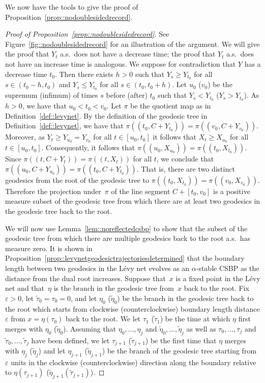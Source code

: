 \documentclass[JEP,XML,SOM,Unicode]{cedram}
\let\epsilon\varepsilon
\theoremstyle{plain}
\numberwithin{theorem}{section}
\theoremstyle{definition}
\let\wt\widetilde
\begin{document}
We now have the tools to give the proof of Proposition~\ref{prop::nodoublesidedrecord}.

\begin{proof}[Proof of Proposition~\ref{prop::nodoublesidedrecord}]
See Figure~\ref{fig::nodoublesidedrecord} for an illustration of the argument. We will give the proof that $Y_t$ a.s.\ does not have a decrease time; the proof that $Y_t$ a.s.\ does not have an increase time is analogous. We suppose for contradiction that $Y$ has a decrease time $t_0$. Then there exists $h > 0$ such that $Y_s \geq Y_{t_0}$ for all $s \in (t_0-h,t_0)$ and $Y_s \leq Y_{t_0}$ for all $s \in (t_0,t_0+h)$. Let $u_0$ (\resp $v_0$) be the supremum (\resp infimum) of times $s$ before (\resp after) $t_0$ such that $Y_s < Y_{t_0}$ (\resp $Y_s > Y_{t_0}$). As $h > 0$, we have that $u_0 < t_0 < v_0$. Let $\pi$ be the quotient map as in Definition~\ref{def::levynet}. By the definition of the geodesic tree in Definition~\ref{def::levynet}, we have that $\pi( (t_0,C+Y_{t_0})) = \pi((v_0,C+Y_{v_0}))$. Moreover, as $Y_t \geq Y_{u_0} = Y_{v_0}$ for all $t \in [u_0,t_0]$ it follows that $X_t \geq X_{u_0}$ for all $t \in [u_0,t_0]$. Consequently, it follows that $\pi((u_0,X_{u_0})) = \pi((t_0,X_{t_0}))$. Since $\pi((t,C+Y_t)) = \pi((t,X_t))$ for all $t$, we conclude that $\pi((u_0,C+Y_{u_0})) = \pi((t_0,C+Y_{t_0}))$. That is, there are two distinct geodesics from the root of the geodesic tree to $\pi((t_0,X_{t_0})) = \pi((v_0,X_{v_0}))$. Therefore the projection under~$\pi$ of the line segment $C + [t_0,v_0]$ is a positive measure subset of the geodesic tree from which there are at least two geodesics in the geodesic tree back to the root.

We will now use Lemma~\ref{lem::noreflectedcsbp} to show that the subset of the geodesic tree from which there are multiple geodesics back to the root a.s.\ has measure zero. It is shown in Proposition~\ref{prop::levynetgeodesictrajectoriesdetermined} that the boundary length between two geodesics in the Lévy net evolves as an $\alpha$-stable CSBP as the distance from the dual root increases. Suppose that~$x$ is a fixed point in the Lévy net and that~$\eta$ is the branch in the geodesic tree from~$x$ back to the root. Fix $\epsilon > 0$, let $\wt{\tau}_0 = \tau_0 = 0$, and let $\eta_0$ (\resp $\wt{\eta}_0$) be the branch in the geodesic tree back to the root which starts from clockwise (\resp counterclockwise) boundary length distance $\epsilon$ from $x = \eta(\tau_0)$ back to the root. We let $\tau_1$ (\resp $\wt{\tau}_1$) be the time at which $\eta$ first merges with $\eta_0$ (\resp $\wt{\eta}_0$). Assuming that $\eta_0,\ldots,\eta_j$ and $\wt{\eta}_0,\ldots,\wt{\eta}_j$ as well as $\tau_0,\ldots,\tau_j$ and $\wt{\tau}_0,\ldots,\wt{\tau}_j$ have been defined, we let $\tau_{j+1}$ (\resp $\wt{\tau}_{j+1}$) be the first time that $\eta$ merges with $\eta_j$ (\resp $\wt{\eta}_j$) and let $\eta_{j+1}$ (\resp $\wt{\eta}_{j+1}$) be the branch of the geodesic tree starting from $\epsilon$ units in the clockwise (\resp counterclockwise) direction along the boundary relative to $\eta(\tau_{j+1})$ (\resp $\wt{\eta}_{j+1}(\wt{\tau}_{j+1})$).


\end{proof}
\end{document}
